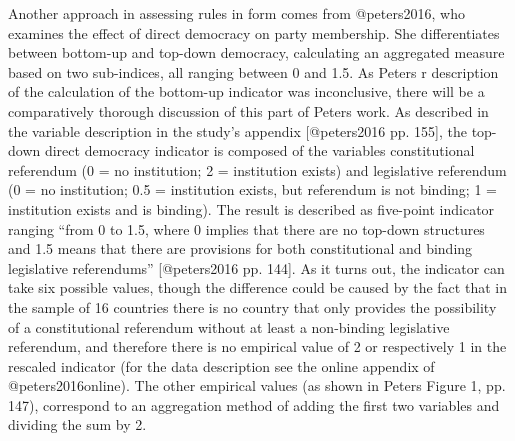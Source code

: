 \documentclass{systats}
\begin{document}
Another approach in assessing rules in form comes from @peters2016, who examines the effect  of direct democracy on party membership. She differentiates between bottom-up and top-down democracy, calculating an aggregated measure based on two sub-indices, all ranging between 0 and 1.5. As Peters r description of the calculation of the bottom-up indicator was inconclusive, there will be a comparatively thorough discussion of this part of Peters work. As described in the variable description in the study’s appendix [@peters2016 pp. 155], the top-down direct democracy indicator is composed of the variables constitutional referendum (0 = no institution; 2 = institution exists) and legislative referendum (0 = no institution; 0.5 = institution exists, but referendum is not binding; 1 = institution exists and is binding). The result is described as five-point indicator ranging “from 0 to 1.5, where 0 implies that there are no top-down structures and 1.5 means that there are provisions for both constitutional and binding legislative referendums” [@peters2016 pp. 144]. As it turns out, the indicator can take six possible values, though the difference could be caused by the fact that in the sample of 16 countries there is no country that only provides the possibility of a constitutional referendum without at least a non-binding legislative referendum, and therefore there is no empirical value of 2 or respectively 1 in the rescaled  indicator (for the data description see the online appendix of @peters2016online). The other empirical values (as shown in Peters Figure 1, pp. 147), correspond to an aggregation method of adding the first two variables and dividing the sum by 2.
\end{document}
